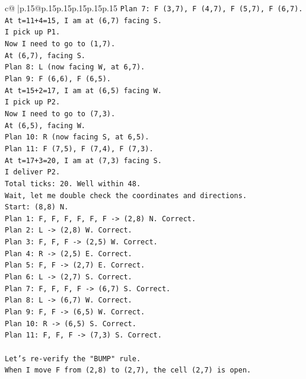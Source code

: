 \documentclass{article}
\begin{document}
{\begin{supertabular}{c@{$\;$}|p{.15\linewidth}@{}p{.15\linewidth}p{.15\linewidth}p{.15\linewidth}p{.15\linewidth}p{.15\linewidth}}
{{{\texttt{Plan 7: F (3,7), F (4,7), F (5,7), F (6,7).} \\
\texttt{At t=11+4=15, I am at (6,7) facing S.} \\
\texttt{I pick up P1.} \\
\texttt{Now I need to go to (1,7).} \\
\texttt{At (6,7), facing S.} \\
\texttt{Plan 8: L (now facing W, at 6,7).} \\
\texttt{Plan 9: F (6,6), F (6,5).} \\
\texttt{At t=15+2=17, I am at (6,5) facing W.} \\
\texttt{I pick up P2.} \\
\texttt{Now I need to go to (7,3).} \\
\texttt{At (6,5), facing W.} \\
\texttt{Plan 10: R (now facing S, at 6,5).} \\
\texttt{Plan 11: F (7,5), F (7,4), F (7,3).} \\
\texttt{At t=17+3=20, I am at (7,3) facing S.} \\
\texttt{I deliver P2.} \\
\texttt{Total ticks: 20. Well within 48.} \\
\texttt{Wait, let me double check the coordinates and directions.} \\
\texttt{Start: (8,8) N.} \\
\texttt{Plan 1: F, F, F, F, F, F {-}> (2,8) N. Correct.} \\
\texttt{Plan 2: L {-}> (2,8) W. Correct.} \\
\texttt{Plan 3: F, F, F {-}> (2,5) W. Correct.} \\
\texttt{Plan 4: R {-}> (2,5) E. Correct.} \\
\texttt{Plan 5: F, F {-}> (2,7) E. Correct.} \\
\texttt{Plan 6: L {-}> (2,7) S. Correct.} \\
\texttt{Plan 7: F, F, F, F {-}> (6,7) S. Correct.} \\
\texttt{Plan 8: L {-}> (6,7) W. Correct.} \\
\texttt{Plan 9: F, F {-}> (6,5) W. Correct.} \\
\texttt{Plan 10: R {-}> (6,5) S. Correct.} \\
\texttt{Plan 11: F, F, F {-}> (7,3) S. Correct.} \\
\\ 
\texttt{Let's re{-}verify the "BUMP" rule.} \\
\texttt{When I move F from (2,8) to (2,7), the cell (2,7) is open.} \\
}}}
\end{supertabular}}
\end{document}
